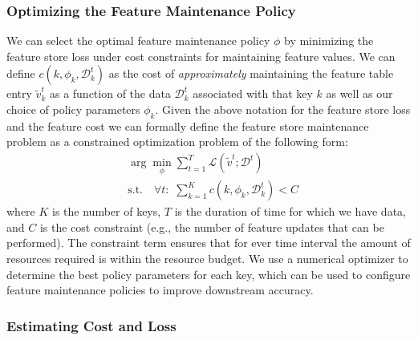 {\subsubsection{Optimizing the Feature Maintenance Policy} 
We can select the optimal feature maintenance policy $\phi$ by minimizing the feature store loss under cost constraints for maintaining feature values. 
We can define $c(k, \phi_k, \mathcal{D}^t_k)$ as the cost of \emph{approximately} maintaining the feature table entry $\tilde{v}^t_k$ as a function of the data $\mathcal{D}^t_k$ associated with that key $k$ as well as our choice of policy parameters $\phi_k$.  Given the above notation for the feature store loss and the feature cost we can formally define the feature store maintenance problem as a constrained optimization problem of the following form:
\begin{align}
& \arg\min_{\phi}  \sum_{t=1}^T 
   \mathcal{L}\left(\tilde{v}^t; \mathcal{D}^t\right)
\\
& \text{s.t.} \quad  \forall t: \,\, \sum_{k=1}^K c\left(k, \phi_k, \mathcal{D}^t_k\right) < C
\end{align}
where $K$ is the number of keys, $T$ is the duration of time for which we have data, and $C$ is the cost constraint (e.g., the number of feature updates that can be performed).
The constraint term ensures that for ever time interval the amount of resources required is within the resource budget. 
We use a numerical optimizer  to determine the best policy parameters for each key, which can be used to configure feature maintenance policies to improve downstream accuracy.  


\subsubsection{Estimating Cost and Loss}



}
